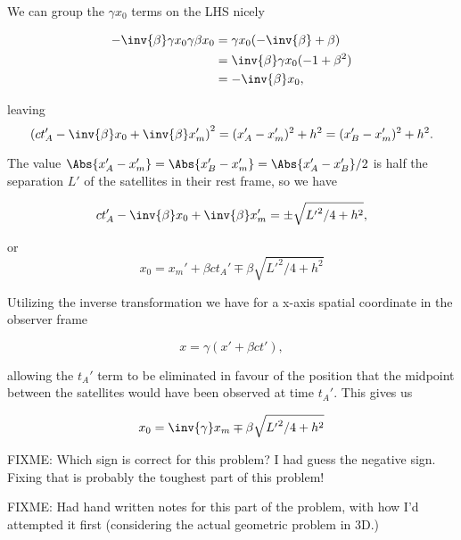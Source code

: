 {We can group the $\gamma x_0$ terms on the LHS nicely

\begin{equation}\label{eqn:relElectroDynProblemSet1:1540}
\begin{aligned}
- \inv{\beta} \gamma x_0 \gamma \beta x_0
&=
\gamma x_0 ( - \inv{\beta} + \beta ) \\
&=
\inv{\beta} \gamma x_0 ( - 1 + \beta^2 ) \\
&=
-\inv{\beta} x_0,
\end{aligned}
\end{equation}

leaving
\begin{equation}\label{eqn:relElectroDynProblemSet1:1400}
\left( c t_A' -\inv{\beta} x_0 + \inv{\beta} x_m' \right)^2 = (x_A' - x_m')^2 + h^2 = (x_B' - x_m')^2 + h^2.
\end{equation}

The value $\Abs{x_A' - x_m'} = \Abs{x_B' - x_m'} = \Abs{x_A' - x_B'}/2$ is half the separation $L'$ of the satellites in their rest frame, so we have

\begin{equation}\label{eqn:relElectroDynProblemSet1:1420}
c t_A' -\inv{\beta} x_0 + \inv{\beta} x_m' = \pm \sqrt{{L'}^2/4 + h^2},
\end{equation}

or
\begin{equation}\label{eqn:relElectroDynProblemSet1:1440}
x_0 = x_m' + \beta c t_A' \mp \beta \sqrt{{L'}^2/4 + h^2}
\end{equation}

Utilizing the inverse transformation we have for a x-axis spatial coordinate in the observer frame

\begin{equation}\label{eqn:relElectroDynProblemSet1:1460}
x = \gamma ( x' + \beta c t'),
\end{equation}

allowing the $t_A'$ term to be eliminated in favour of the position that the midpoint between the satellites would have been observed at time $t_A'$.  This gives us

\begin{equation}\label{eqn:relElectroDynProblemSet1:1480}
x_0 = \inv{\gamma} x_m \mp \beta \sqrt{{L'}^2/4 + h^2}
\end{equation}

FIXME: Which sign is correct for this problem?  I had guess the negative sign.  Fixing that is probably the toughest part of this problem!


FIXME: Had hand written notes for this part of the problem, with how I'd attempted it first (considering the actual geometric problem in 3D.)

} %

